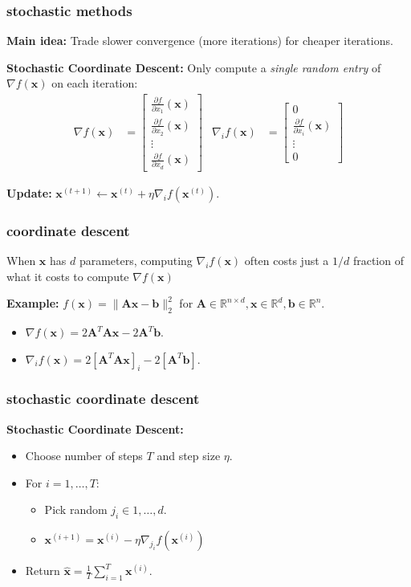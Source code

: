 \documentclass[compress]{beamer}
\newcommand{\bv}[1]{\mathbf{#1}}
\newcommand{\R}{\mathbb{R}}
\begin{document}
\begin{frame}
	\frametitle{stochastic methods}
	\textbf{Main idea:} Trade slower convergence (more iterations) for cheaper iterations. 
	\vspace{2em}
	
	\textbf{Stochastic \alert{Coordinate Descent}:}
	Only compute a \emph{single random entry} of $\nabla f(\bv{x})$ on each iteration:
	\begin{align*}
		\nabla f(\bv{x}) &= 
		\begin{bmatrix}
			\frac{\partial f}{\partial x_1}(\bv{x}) \\ \frac{\partial f}{\partial x_2}(\bv{x}) \\ \vdots \\ \frac{\partial f}{\partial x_d}(\bv{x})  
		\end{bmatrix} & 	\nabla_i f(\bv{x}) &= 
		\begin{bmatrix}
			0\\ \frac{\partial f}{\partial x_i}(\bv{x}) \\ \vdots \\ 0
		\end{bmatrix} 
	\end{align*}
	
	\textbf{Update:} $\bv{x}^{(t+1)}\leftarrow \bv{x}^{(t)} + \eta \nabla_i f(\bv{x}^{(t)})$.
\end{frame}

\begin{frame}[t]
	\frametitle{coordinate descent}
	When $\bv{x}$ has $d$ parameters, computing $\nabla_i f(\bv{x})$ often costs just a $1/d$ fraction of what it costs to compute $\nabla f(\bv{x})$ 
	
	\vspace{1em}
	\textbf{Example:} $f(\bv{x}) = \|\bv{A}\bv{x} - \bv{b}\|_2^2$ for $\bv{A} \in \R^{n\times d}, \bv{x} \in \R^{d}, \bv{b} \in \R^n$. 
	\begin{itemize}
		\item $\nabla f(\bv{x}) = 2\bv{A}^T\bv{A}\bv{x} - 2\bv{A}^T\bv{b}$.
		\item $\nabla_i f(\bv{x}) = 2\left[\bv{A}^T\bv{A}\bv{x}\right]_i - 2\left[\bv{A}^T\bv{b}\right]$.
	\end{itemize}
\end{frame}

\begin{frame}[t]
	\frametitle{stochastic coordinate descent}	
	\textbf{Stochastic Coordinate Descent:}
	\begin{itemize}
		\item Choose number of steps $T$ and step size $\eta$.
		\item For $i = 1,\ldots, T$:
		\begin{itemize}
			\item Pick random $j_i \in 1, \ldots, d$.
			\item $\bv{x}^{(i+1)} = \bv{x}^{(i)} - \eta \nabla_{j_i} f(\bv{x}^{(i)})$
		\end{itemize}
		\item Return $\hat{\bv{x}} = \frac{1}{T}\sum_{i=1}^T \bv{x}^{(i)}$.
	\end{itemize}
\end{frame}
\end{document}
